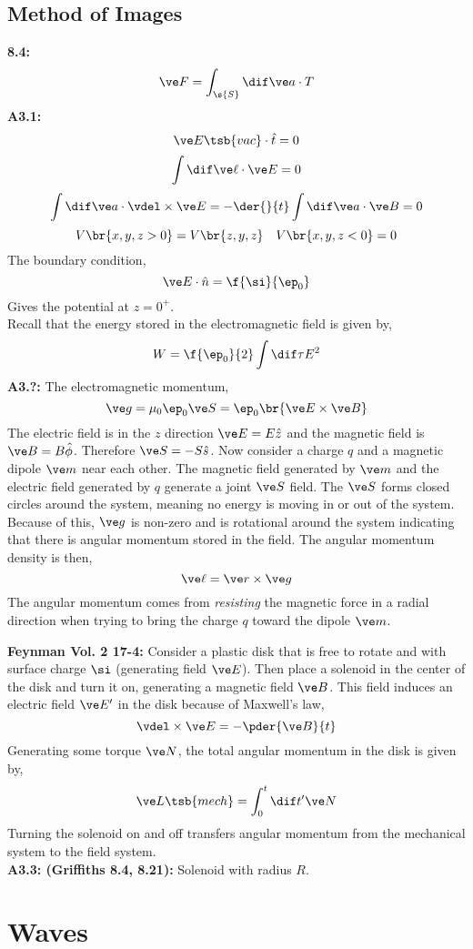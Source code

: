 \documentclass{article}
\begin{document}
\subsection{Method of Images}

\textbf{8.4:}
\[ \ve F = \int_{\s{S}} \dif \ve a \cdot T \]
\textbf{A3.1:}
\[ \ve E\tsb{vac} \cdot \hat t = 0 \]
\[ \int \dif \ve \ell \cdot \ve E = 0 \]
\[ \int \dif \ve a \cdot \vdel \times \ve E = - \der{}{t} \int \dif \ve a \cdot \ve B = 0 \]
\[ V\br{x,y,z>0} = V\br{z,y,z} \quad V\br{x,y,z < 0} = 0\]
The boundary condition,
\[ \ve E \cdot \hat n = \f{\si}{\ep_0} \]
Gives the potential at $z = 0^{+}$. \\
Recall that the energy stored in the electromagnetic field is given by,
\[ W = \f{\ep_0}{2} \int \dif \tau E^2 \]
\textbf{A3.?:} The electromagnetic momentum,
\[ \ve g = \mu_0 \ep_0 \ve S = \ep_0 \br{\ve E \times \ve B} \]
The electric field is in the $z$ direction $\ve E = E \hat z$ and the magnetic field is $\ve B = B \hat \phi$. Therefore $\ve S = - S \hat s$. Now consider a charge $q$ and a magnetic dipole $\ve m$ near each other. The magnetic field generated by $\ve m$ and the electric field generated by $q$ generate a joint $\ve S$ field. The $\ve S$ forms closed circles around the system, meaning no energy is moving in or out of the system. Because of this, $\ve g$ is non-zero and is rotational around the system indicating that there is angular momentum stored in the field. The angular momentum density is then,
\[ \ve \ell = \ve r \times \ve g \]
The angular momentum comes from \textit{resisting} the magnetic force in a radial direction when trying to bring the charge $q$ toward the dipole $\ve m$.

\textbf{Feynman Vol. 2 17-4:} Consider a plastic disk that is free to rotate and with surface charge $\si$ (generating field $\ve E$). Then place a solenoid in the center of the disk and turn it on, generating a magnetic field $\ve B$. This field induces an electric field $\ve E'$ in the disk because of Maxwell's law,
\[ \vdel \times \ve E = - \pder{\ve B}{t} \]
Generating some torque $\ve N$, the total angular momentum in the disk is given by,
\[ \ve L\tsb{mech} = \int_{0}^{t} \dif t' \ve N \]
Turning the solenoid on and off transfers angular momentum from the mechanical system to the field system.\\
\textbf{A3.3: (Griffiths 8.4, 8.21):} Solenoid with radius $R$.

\section{Waves}
\end{document}
